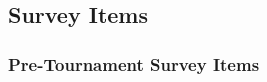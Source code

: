\begin{CJK}{UTF8}{gbsn}
  \subsection{Survey Items\label{app8:surveyItems}}


  \subsubsection{Pre-Tournament Survey Items\label{app8:surveyPre}}








\end{CJK}
